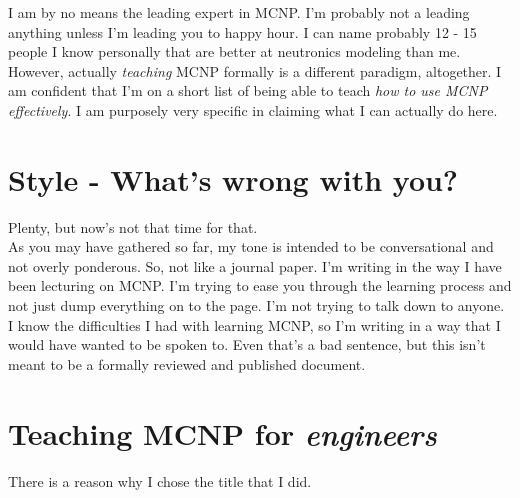 \documentclass[11pt,a4paper]{article}
\begin{document}
\noindent I am by no means the leading expert in MCNP. I'm probably not a leading anything unless I'm leading you to happy hour. I can name probably 12 - 15 people I know personally that are better at neutronics modeling than me. However, actually \textit{teaching} MCNP formally is a different paradigm, altogether. I am confident that I'm on a short list of being able to teach \textit{how to use MCNP effectively}. I am purposely very specific in claiming what I can actually do here. 

\section{Style - What's wrong with you?}
\noindent Plenty, but now's not that time for that. \\

\noindent As you may have gathered so far, my tone is intended to be conversational and not overly ponderous. So, not like a journal paper. I'm writing in the way I have been lecturing on MCNP. I'm trying to ease you through the learning process and not just dump everything on to the page. I'm not trying to talk down to anyone. I know the difficulties I had with learning MCNP, so I'm writing in a way that I would have wanted to be spoken to. Even that's a bad sentence, but this isn't meant to be a formally reviewed and published document.

\newpage


\section{Teaching MCNP for \textit{engineers}}
\noindent There is a reason why I chose the title that I did. 
\end{document}
